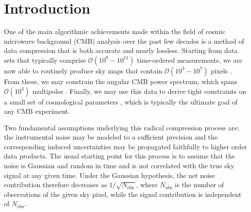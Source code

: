 \documentclass{aa}
\begin{document}

\maketitle



\section{Introduction}
\label{sec:introduction}

One of the main algorithmic achievements made within the field of cosmic microwave background (CMB)
analysis over the past few decades is a method of data compression that is both accurate and nearly lossless. Starting from data sets that typically comprise
$\mathcal{O}(10^8-10^{11})$ time-ordered measurements, we are now able
to routinely produce sky maps that contain $\mathcal{O}(10^3-10^{7})$
pixels \citep[e.g.,][]{tegmark_mapmaking,ashdown:2007}. From these, we may constrain
the angular CMB power spectrum, which spans $\mathcal{O}(10^3)$
multipoles \citep[e.g.,][]{gorski:1994,hivon:2002,wandelt2004}. Finally, we may use this data to derive tight constraints on a small set of cosmological
parameters \citep[e.g.,][]{bond:2000,cosmomc,planck2016-l05,planck2016-l06},
which is typically the ultimate goal of any CMB experiment.

Two fundamental assumptions underlying this radical compression process
are: the instrumental noise may be modeled to a sufficient
precision and the corresponding induced uncertainties may be
propagated faithfully to higher order data products. The usual starting
point for this process is to assume that the noise is
Gaussian and random in time and is not correlated with the true sky
signal at any given time. Under the Gaussian hypothesis, the net noise
contribution therefore decreases as $1/\sqrt{N_{\mathrm{obs}}}$, where
$N_{\mathrm{obs}}$ is the number of observations of the given sky pixel,
while the signal contribution is independent of $N_{\mathrm{obs}}$.
\end{document}
